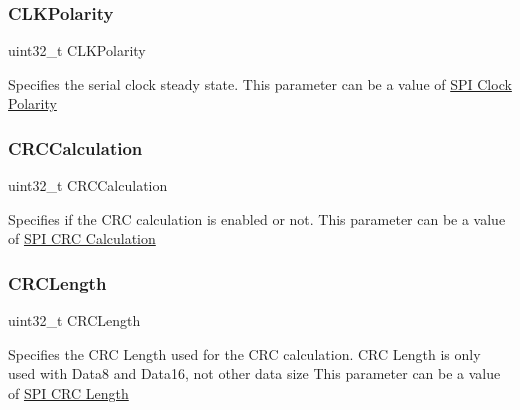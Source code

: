 \subsubsection{\texorpdfstring{C\+L\+K\+Polarity}{CLKPolarity}}
{\footnotesize\ttfamily uint32\+\_\+t C\+L\+K\+Polarity}

Specifies the serial clock steady state. This parameter can be a value of \hyperlink{group___s_p_i___clock___polarity}{S\+PI Clock Polarity} \mbox{\label{struct_s_p_i___init_type_def_a9d334a47c34b01cbfa55ff66cfc1e0ce}} 
\subsubsection{\texorpdfstring{C\+R\+C\+Calculation}{CRCCalculation}}
{\footnotesize\ttfamily uint32\+\_\+t C\+R\+C\+Calculation}

Specifies if the C\+RC calculation is enabled or not. This parameter can be a value of \hyperlink{group___s_p_i___c_r_c___calculation}{S\+PI C\+RC Calculation} \mbox{\label{struct_s_p_i___init_type_def_aba709d1ebebac9b3385fb61d6eeb79a2}} 
\subsubsection{\texorpdfstring{C\+R\+C\+Length}{CRCLength}}
{\footnotesize\ttfamily uint32\+\_\+t C\+R\+C\+Length}

Specifies the C\+RC Length used for the C\+RC calculation. C\+RC Length is only used with Data8 and Data16, not other data size This parameter can be a value of \hyperlink{group___s_p_i___c_r_c__length}{S\+PI C\+RC Length} \mbox{\label{struct_s_p_i___init_type_def_a48aef59cfd7bf0262b1ad993fef2fc7b}} 
